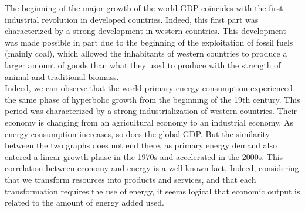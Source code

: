 \documentclass[conference]{IEEEtran}
\begin{document}
The beginning of the major growth of the world GDP coincides with the first industrial revolution in developed countries. Indeed, this first part was characterized by a strong development in western countries. This development was made possible in part due to the beginning of the exploitation of fossil fuels (mainly coal), which allowed the inhabitants of western countries to produce a larger amount of goods than what they used to produce with the strength of animal and traditional biomass.
\\
Indeed, we can observe that the world primary energy consumption experienced the same phase of hyperbolic growth from the beginning of the 19th century. This period was characterized by a strong industrialization of western countries. Their economy is changing from an agricultural economy to an industrial economy. As energy consumption increases, so does the global GDP. 
But the similarity between the two graphs does not end there, as primary energy demand also entered a linear growth phase in the 1970s and accelerated in the 2000s. This correlation between economy and energy is a well-known fact. Indeed, considering that we transform resources into products and services, and that each transformation requires the use of energy, it seems logical that economic output is related to the amount of energy added used. 
\\
\end{document}
